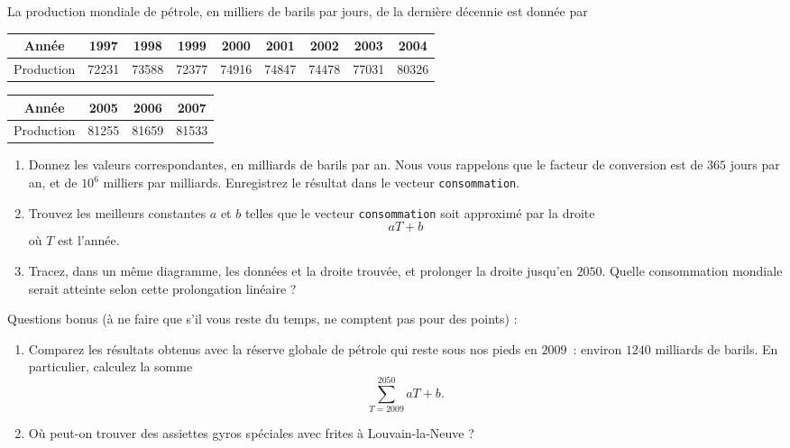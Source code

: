 \begin{exercice}\label{exoMatlab0017}

	La production mondiale de pétrole, en milliers de barils par jours, de la dernière décennie est donnée par

	\begin{center}
	\begin{tabular}{|c|cccccccc|}
	\hline
	Année & 1997 & 1998 & 1999 & 2000 & 2001 & 2002 & 2003 & 2004  \\
	\hline
	Production & 72231 &	73588 &	72377 &	74916 &	74847 &	74478 &	77031 &	80326\\
	\hline
	\end{tabular}
	\end{center}

	\begin{center}
	\begin{tabular}{|c|ccc|}
	\hline
	Année & 2005 & 2006 & 2007 \\
	\hline
	Production & 81255 &	81659 & 81533\\
	\hline
	\end{tabular}
	\end{center}
	
	
	 \begin{enumerate}

		 \item
			 Donnez les valeurs correspondantes, en milliards de barils par an. Nous vous rappelons que le facteur de conversion est de $365$ jours par an, et de $10^6$ milliers par milliards. Enregistrez le résultat dans le vecteur \verb+consommation+.
		\item
			Trouvez les meilleurs constantes $a$ et $b$ telles que le vecteur \verb+consommation+ soit approximé par la droite
			\begin{equation}
				aT+b
			\end{equation}
			où $T$ est l'année.

		\item
			Tracez, dans un même diagramme, les données et la droite trouvée, et prolonger la droite jusqu'en $2050$. Quelle consommation mondiale serait atteinte selon cette prolongation linéaire ?

	 \end{enumerate}

	 Questions bonus (à ne faire que s'il vous reste du temps, ne comptent pas pour des points) :
	 \begin{enumerate}

		\item
			Comparez les résultats obtenus avec la réserve globale de pétrole qui reste sous nos pieds en $2009$~: environ $1240$ milliards de barils. En particulier, calculez la somme
			\begin{equation}
				\sum_{T=2009}^{2050}aT+b.
			\end{equation}
			 
		\item
			Où peut-on trouver des assiettes gyros spéciales avec frites à Louvain-la-Neuve ?
	 \end{enumerate}


\end{exercice}
